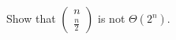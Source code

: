 \documentclass[12pt]{article}
\begin{document}
Show that $\left(\begin{array}{c}n\\\frac{n}{2}\end{array}\right)$ is not $\Theta\left(2^n\right)$.
\end{document}
